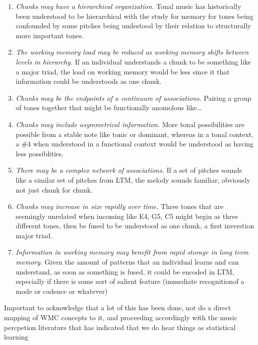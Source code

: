 \documentclass[]{book}
\providecommand{\tightlist}{%
  \setlength{\itemsep}{0pt}\setlength{\parskip}{0pt}}
\theoremstyle{definition}
\theoremstyle{definition}
\theoremstyle{definition}
\theoremstyle{remark}
\begin{document}
\begin{enumerate}
\def\labelenumi{\arabic{enumi}.}
\tightlist
\item
  \emph{Chunks may have a hierarchical organization.} Tonal music has
  historically been understood to be hierarchical
  \citep{krumhanslCognitiveFoundationsMusical2001, meyerEmotionMeaningMusic1956, schenkerFreieSatz1935}
  with the study for memory for tones being confounded by some pitches
  being undestood by their relation to structurally more important
  tones.
\item
  \emph{The working memory load may be reduced as working memory shifts
  between levels in hierarchy.} If an individual understands a chunk to
  be something like a major triad, the load on working memory would be
  less since it that information could be understoods as one chunk.
\item
  \emph{Chunks may be the endpoints of a continuum of associations.}
  Pairing a group of tones together that might be functionally anomolous
  like\ldots{}
\item
  \emph{Chunks may include asymmetrical information.} More tonal
  possibilities are possible from a stable note like tonic or dominant,
  whereas in a tonal context, a \#4 when understood in a functional
  context would be understood as having less possiblities.
\item
  \emph{There may be a complex network of associations.} If a set of
  pitches sounds like a similar set of pitches from LTM, the melody
  sounds familiar, obviously not just chunk for chunk.
\item
  \emph{Chunks may increase in size rapidly over time.} Three tones that
  are seemingly unrelated when incoming like E4, G5, C5 might begin as
  three different tones, then be fused to be understood as one chunk, a
  first inverstion major triad.
\item
  \emph{Information in working memory may benefit from rapid storage in
  long term memory.} Given the amount of patterns that an individual
  learns and can understand, as soon as something is fused, it could be
  encoded in LTM, especially if there is some sort of salient feature
  (immediate recognitionof a mode or cadence or whatever)
\end{enumerate}

Important to acknowledge that a lot of this has been done, not do a
direct mapping of WMC concepts to it, and proceeding accordingly with
the music percpetion literature that has indicated that we do hear
things as statistical learning
\end{document}
